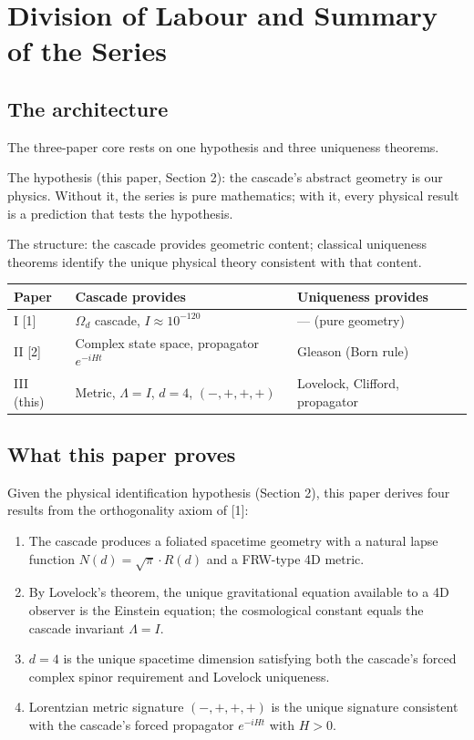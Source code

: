 \documentclass[12pt,a4paper]{article}
\begin{document}
\tableofcontents
\newpage

\section{Division of Labour and Summary of the Series}

\subsection{The architecture}

The three-paper core rests on one hypothesis and three uniqueness theorems.

The hypothesis (this paper, Section 2): the cascade's abstract geometry is our physics.
Without it, the series is pure mathematics; with it, every physical result is a prediction
that tests the hypothesis.

The structure: the cascade provides geometric content; classical uniqueness theorems
identify the unique physical theory consistent with that content.

\begin{center}
\begin{tabular}{lll}
\hline
Paper & Cascade provides & Uniqueness provides \\
\hline
I [1] & $\Omega_d$ cascade, $I \approx 10^{-120}$ & --- (pure geometry) \\
II [2] & Complex state space, propagator $e^{-iHt}$ & Gleason (Born rule) \\
III (this) & Metric, $\Lambda = I$, $d = 4$, $(-,+,+,+)$ & Lovelock, Clifford, propagator \\
\hline
\end{tabular}
\end{center}

\subsection{What this paper proves}

Given the physical identification hypothesis (Section 2), this paper derives four results
from the orthogonality axiom of [1]:

\begin{enumerate}
\item The cascade produces a foliated spacetime geometry with a natural lapse function
$N(d) = \sqrt{\pi} \cdot R(d)$ and a FRW-type 4D metric.
\item By Lovelock's theorem, the unique gravitational equation available to a 4D observer
is the Einstein equation; the cosmological constant equals the cascade invariant
$\Lambda = I$.
\item $d = 4$ is the unique spacetime dimension satisfying both the cascade's forced complex
spinor requirement and Lovelock uniqueness.
\item Lorentzian metric signature $(-,+,+,+)$ is the unique signature consistent with the
cascade's forced propagator $e^{-iHt}$ with $H > 0$.
\end{enumerate}
\end{document}
